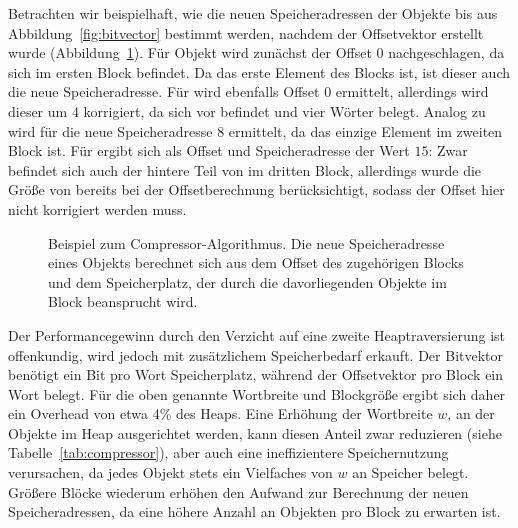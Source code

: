 Betrachten wir beispielhaft, wie die neuen Speicheradressen der Objekte  bis  aus Abbildung~\ref{fig:bitvector} bestimmt werden, nachdem der Offsetvektor erstellt wurde (Abbildung~\ref{fig:compressor-example}).
Für Objekt  wird zunächst der Offset $0$ nachgeschlagen, da sich  im ersten Block befindet.
Da  das erste Element des Blocks ist, ist dieser auch die neue Speicheradresse.
Für  wird ebenfalls Offset $0$ ermittelt, allerdings wird dieser um $4$ korrigiert, da sich  vor  befindet und vier Wörter belegt.
Analog zu  wird für  die neue Speicheradresse $8$ ermittelt, da  das einzige Element im zweiten Block ist.
Für  ergibt sich als Offset und Speicheradresse der Wert $15$:
Zwar befindet sich auch der hintere Teil von  im dritten Block, allerdings wurde die Größe von  bereits bei der Offsetberechnung berücksichtigt, sodass der Offset hier nicht korrigiert werden muss.


\begin{figure}[h]
	\centering
	
	\caption[Beispiel zum Compressor-Algorithmus]{Beispiel zum Compressor-Algorithmus. Die neue Speicheradresse eines Objekts berechnet sich aus dem Offset des zugehörigen Blocks und dem Speicherplatz, der durch die davorliegenden Objekte im Block beansprucht wird.}
	\label{fig:compressor-example}
\end{figure}

Der Performancegewinn durch den Verzicht auf eine zweite Heaptraversierung ist offenkundig, wird jedoch mit zusätzlichem Speicherbedarf erkauft.
Der Bitvektor benötigt ein Bit pro Wort Speicherplatz, während der Offsetvektor pro Block ein Wort belegt.
Für die oben genannte Wortbreite und Blockgröße ergibt sich daher ein Overhead von etwa 4\% des Heaps.
Eine Erhöhung der Wortbreite $w$, an der Objekte im Heap ausgerichtet werden, kann diesen Anteil zwar reduzieren (siehe Tabelle~\ref{tab:compressor}), aber auch eine ineffizientere Speichernutzung verursachen, da jedes Objekt stets ein Vielfaches von $w$ an Speicher belegt.
Größere Blöcke wiederum erhöhen den Aufwand zur Berechnung der neuen Speicheradressen, da eine höhere Anzahl an Objekten pro Block zu erwarten ist.

